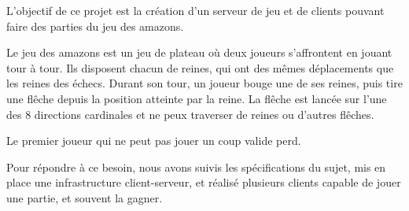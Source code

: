 L'objectif de ce projet est la création d'un serveur de jeu et de clients pouvant faire des parties 
du jeu des amazons.

Le jeu des amazons est un jeu de plateau où deux joueurs s'affrontent en jouant tour à tour.
Ils disposent chacun de reines, qui ont des mêmes déplacements que les reines des échecs.
Durant son tour, un joueur bouge une de ses reines, puis tire une flêche depuis la position atteinte par la reine.
La flêche est lancée sur l'une des 8 directions cardinales et ne peux traverser de reines ou d'autres flêches.

Le premier joueur qui ne peut pas jouer un coup valide perd.

Pour répondre à ce besoin, nous avons suivis les spécifications du sujet,
mis en place une infrastructure client-serveur, et réalisé plusieurs clients 
capable de jouer une partie, et souvent la gagner.

